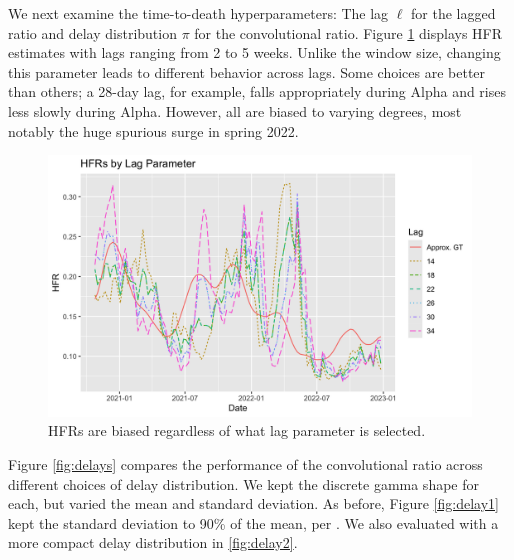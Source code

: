 \documentclass{article}
\begin{document}
We next examine the time-to-death hyperparameters: The lag $\ell$ for the lagged ratio and delay distribution $\pi$ for the convolutional ratio. Figure \ref{fig:lag} displays HFR estimates with lags ranging from 2 to 5 weeks. Unlike the window size, changing this parameter leads to different behavior across lags. Some choices are better than others; a 28-day lag, for example, falls appropriately during Alpha and rises less slowly during Alpha. However, all are biased to varying degrees, most notably the huge spurious surge in spring 2022.

\begin{figure}
    \centering
    \includegraphics[width=0.7\linewidth]{Figs/hfrs_by_lag.png}
    \caption{HFRs are biased regardless of what lag parameter is selected.}
    \label{fig:lag}
\end{figure}

Figure \ref{fig:delays} compares the performance of the convolutional ratio across different choices of delay distribution. We kept the discrete gamma shape for each, but varied the mean and standard deviation. As before, Figure \ref{fig:delay1} kept the standard deviation to 90\% of the mean, per \citeauthor{UKdelay}. We also evaluated with a more compact delay distribution in \ref{fig:delay2}. 

\end{document}
